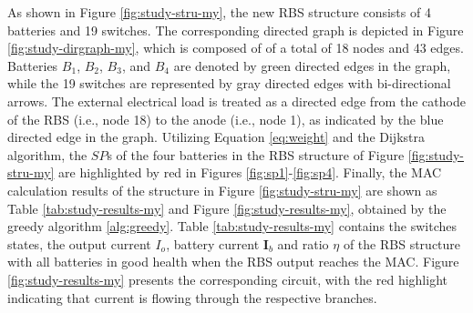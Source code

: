 \documentclass{article}
\begin{document}
As shown in Figure \ref{fig:study-stru-my}, the new RBS structure consists of 4 batteries and 19 switches. 
The corresponding directed graph is depicted in Figure \ref{fig:study-dirgraph-my}, which is composed of of a total of 18 nodes and 43 edges. 
Batteries $B_1$, $B_2$, $B_3$, and $B_4$ are denoted by green directed edges in the graph, while the 19 switches are represented by gray directed edges with bi-directional arrows. 
The external electrical load is treated as a directed edge from the cathode of the RBS (i.e., node 18) to the anode (i.e., node 1), as indicated by the blue directed edge in the graph.
Utilizing Equation \ref{eq:weight} and the Dijkstra algorithm, the $SP$s of the four batteries in the RBS structure of Figure \ref{fig:study-stru-my} are highlighted by red in Figures \ref{fig:sp1}-\ref{fig:sp4}.
Finally, the MAC calculation results of the structure in Figure \ref{fig:study-stru-my} are shown as Table \ref{tab:study-results-my} and Figure \ref{fig:study-results-my}, obtained by the greedy algorithm \ref{alg:greedy}.
Table \ref{tab:study-results-my} contains the switches states, the output current $I_o$, battery current $\bm{I}_b$ and ratio $\eta$ of the RBS structure with all batteries in good health when the RBS output reaches the MAC.
Figure \ref{fig:study-results-my} presents the corresponding circuit, with the red highlight indicating that current is flowing through the respective branches.
\end{document}
